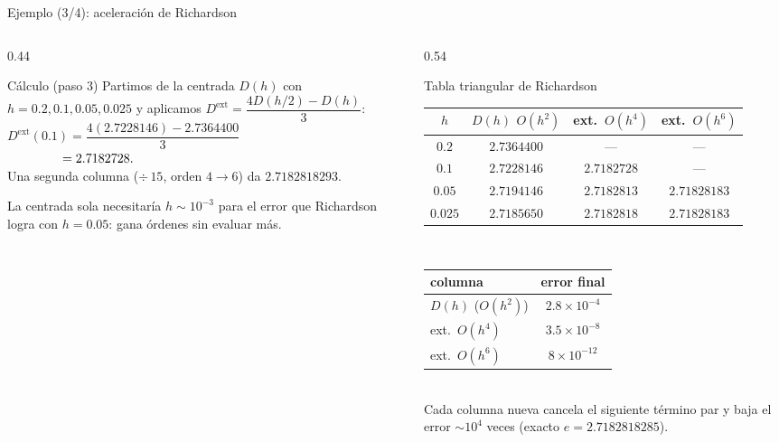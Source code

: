 \documentclass[aspectratio=169,10pt]{beamer}
\begin{document}
\begin{frame}{Ejemplo (3/4): aceleración de Richardson}
\begin{columns}[T]
\begin{column}{0.44\textwidth}
\begin{cardidea}{Cálculo (paso 3)}{\faCalculator}
{\footnotesize Partimos de la centrada $D(h)$ con $h=0.2,0.1,0.05,0.025$ y aplicamos $D^{\text{ext}}=\dfrac{4D(h/2)-D(h)}{3}$:\\[1.0mm]
$D^{\text{ext}}(0.1)=\dfrac{4(2.7228146)-2.7364400}{3}$\\[0.6mm]
$\hphantom{D^{\text{ext}}(0.1)}=2.7182728.$\\[1.0mm]
Una segunda columna ($\div\,15$, orden $4\to6$) da $2.7182818293$.}
\end{cardidea}
\vspace{1mm}
\begin{cardnota}[\faInfoCircle]
{\footnotesize La centrada sola necesitaría $h\sim10^{-3}$ para el error que Richardson logra con $h=0.05$: gana órdenes sin evaluar más.}
\end{cardnota}
\end{column}
\begin{column}{0.54\textwidth}
\begin{cardgear}{Tabla triangular de Richardson}{\faTable}
\centering
{\footnotesize\renewcommand{\arraystretch}{1.35}\setlength{\tabcolsep}{5pt}
\begin{tabular}{c|c|c|c}
$h$ & $D(h)$ $O(h^2)$ & ext.\ $O(h^4)$ & ext.\ $O(h^6)$\\\hline
$0.2$   & $2.7364400$ & —          & —\\
$0.1$   & $2.7228146$ & $2.7182728$ & —\\
$0.05$  & $2.7194146$ & $2.7182813$ & $2.71828183$\\
$0.025$ & $2.7185650$ & $2.7182818$ & $2.71828183$\\
\end{tabular}}\\[1.4mm]
{\footnotesize\renewcommand{\arraystretch}{1.25}\setlength{\tabcolsep}{7pt}
\begin{tabular}{l|c}
columna & error final\\\hline
$D(h)$ ($O(h^2)$) & $2.8{\times}10^{-4}$\\
ext.\ $O(h^4)$ & $3.5{\times}10^{-8}$\\
ext.\ $O(h^6)$ & $8{\times}10^{-12}$\\
\end{tabular}}\\[1.2mm]
{\footnotesize Cada columna nueva cancela el siguiente término par y baja el error $\sim10^{4}$ veces (exacto $e=2.7182818285$).}
\end{cardgear}
\end{column}
\end{columns}
\end{frame}
\end{document}
